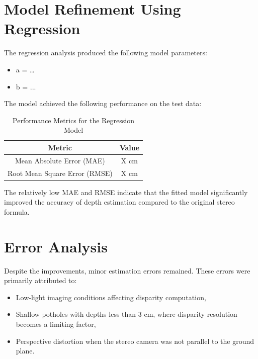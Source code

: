\section{\textbf{Model Refinement Using Regression}}
The regression analysis produced the following model parameters:
\begin{itemize}
	\item a = …
	\item b = ...
\end{itemize}

The model achieved the following performance on the test data:

\begin{table}[H]
	\centering
	\begin{tabular}{|c|c|}
		\hline
		\textbf{Metric} & \textbf{Value} \\ \hline
		Mean Absolute Error (MAE) & X cm \\ \hline
		Root Mean Square Error (RMSE) & X cm \\ \hline
	\end{tabular}
	\caption{Performance Metrics for the Regression Model}
	\label{tab:performance_metrics}
\end{table}

The relatively low MAE and RMSE indicate that the fitted model significantly improved the accuracy of depth estimation compared to the original stereo formula.


\section{\textbf{Error Analysis}}
Despite the improvements, minor estimation errors remained. These errors were primarily attributed to:
\begin{itemize}
	\item Low-light imaging conditions affecting disparity computation,
	\item Shallow potholes with depths less than 3 cm, where disparity resolution becomes a limiting factor,
	\item Perspective distortion when the stereo camera was not parallel to the ground plane.
\end{itemize}


